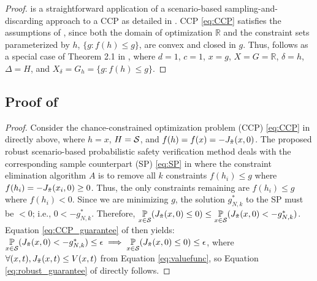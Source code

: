 \begin{proof}
     is a straightforward application of a scenario-based sampling-and-discarding approach to a CCP as detailed in \citet{campi2011sampling}.
    CCP \eqref{eq:CCP} satisfies the assumptions of \citet{campi2011sampling}, since both the domain of optimization $\mathbb{R}$ and the constraint sets parameterized by $h$, $\{g: f(h) \le g\}$, are convex and closed in $g$. Thus,  follows as a special case of Theorem 2.1 in \citet{campi2011sampling}, where $d=1$, $c=1$, $x=g$, $X=G=\mathbb{R}$, $\delta=h$, $\Delta=H$, and $X_\delta=G_h=\{g: f(h) \le g\}$.
\end{proof}

\subsection{Proof of \texorpdfstring{}{Robust Scenario-Based Probabilistic Safety Verification Theorem}}\label{apd:scenario-based_theorem_proof}

\begin{proof}
    Consider the chance-constrained optimization problem (CCP) \eqref{eq:CCP} in  directly above, where $h=x$, $H=\mathcal{S}$, and $f(h)=f(x)=-J_{\Tilde{\pi}}(x,0)$. The proposed robust scenario-based probabilistic safety verification method deals with the corresponding sample counterpart (SP) \eqref{eq:SP} in  where the constraint elimination algorithm $A$ is to remove all $k$ constraints $f(h_i) \le g$ where $f(h_i)=-J_{\Tilde{\pi}}(x_i,0) \ge 0$. Thus, the only constraints remaining are $f(h_i) \le g$ where $f(h_i) < 0$. Since we are minimizing $g$, the solution $g^*_{N,k}$ to the SP must be $< 0$; i.e., $0 < -g^*_{N,k}$. Therefore, $\underset{x \in \mathcal{S}}{\mathbb{P}} ( J_{\Tilde{\pi}}(x,0) \le 0 ) \le \underset{x \in \mathcal{S}}{\mathbb{P}} ( J_{\Tilde{\pi}}(x,0) < -g^*_{N,k} )$. Equation \eqref{eq:CCP_guarantee} of  then yields: $\underset{x \in \mathcal{S}}{\mathbb{P}} ( J_{\Tilde{\pi}}(x,0) < -g^*_{N,k} ) \le \epsilon \implies \underset{x \in \mathcal{S}}{\mathbb{P}} ( J_{\Tilde{\pi}}(x,0) \le 0 ) \le \epsilon$, where $\forall (x,t), J_{\Tilde{\pi}}(x,t) \le V(x, t)$ from Equation \eqref{eq:valuefunc}, so Equation \eqref{eq:robust_guarantee} of  directly follows.
\end{proof}